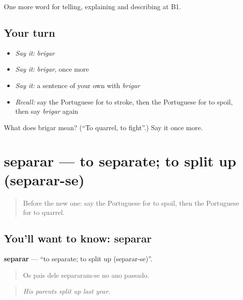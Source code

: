 \begin{grammarlens}[title={What you've built}]
One more word for telling, explaining and describing at B1.
\end{grammarlens}

\subsection*{Your turn}
\begin{itemize}
\raggedright
  \item \emph{Say it:} \emph{brigar}
  \item \emph{Say it:} \emph{brigar}, once more
  \item \emph{Say it:} a sentence of your own with \emph{brigar}
  \item \emph{Recall:} say the Portuguese for to stroke, then the Portuguese for to spoil, then say \emph{brigar} again
\end{itemize}

\begin{tcolorbox}[breakable,colback=teal!4,colframe=teal!35!black,title={Before you move on}]
What does brigar mean? (\textquotedblleft{}To quarrel, to fight\textquotedblright{}.) Say it once more.
\end{tcolorbox}
\section[separar]{separar — to separate; to split up (separar-se)}

\label{lesson:PT-C497-separar}



\begin{quote}
Before the new one: say the Portuguese for to spoil, then the Portuguese for to quarrel.
\end{quote}

\subsection*{You'll want to know: separar}
\textbf{separar} — \textquotedblleft{}to separate; to split up (separar-se)\textquotedblright{}.

\begin{quote}
Os pais dele separaram-se no ano passado.
\end{quote}

\begin{quote}
\emph{His parents split up last year.}
\end{quote}

